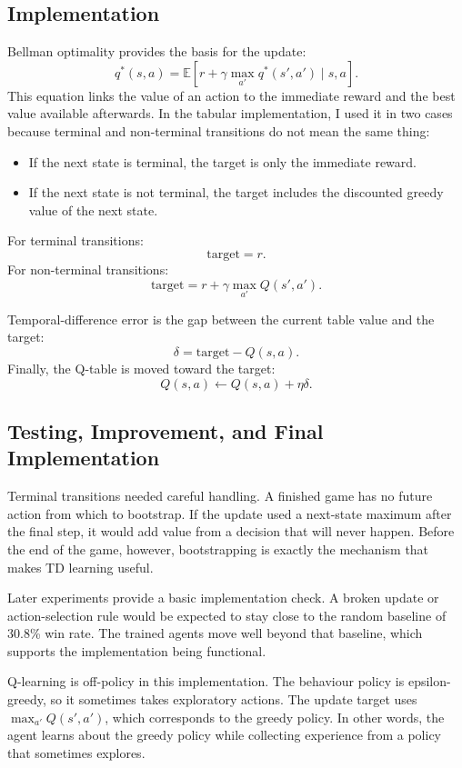 \documentclass[11pt,a4paper]{article}
\begin{document}
\subsection{Implementation}

Bellman optimality provides the basis for the update:
\[
q^*(s, a) = \mathbb{E}[r + \gamma \max_{a'} q^*(s', a') \mid s, a].
\]
This equation links the value of an action to the immediate reward and the best value available afterwards. In the tabular implementation, I used it in two cases because terminal and non-terminal transitions do not mean the same thing:

\begin{itemize}[leftmargin=1.5em]
  \item If the next state is terminal, the target is only the immediate reward.
  \item If the next state is not terminal, the target includes the discounted greedy value of the next state.
\end{itemize}

For terminal transitions:
\[
\text{target} = r.
\]
For non-terminal transitions:
\[
\text{target} = r + \gamma \max_{a'} Q(s', a').
\]

Temporal-difference error is the gap between the current table value and the target:
\[
\delta = \text{target} - Q(s, a).
\]
Finally, the Q-table is moved toward the target:
\[
Q(s, a) \leftarrow Q(s, a) + \eta \delta.
\]

\subsection{Testing, Improvement, and Final Implementation}

Terminal transitions needed careful handling. A finished game has no future action from which to bootstrap. If the update used a next-state maximum after the final step, it would add value from a decision that will never happen. Before the end of the game, however, bootstrapping is exactly the mechanism that makes TD learning useful.

Later experiments provide a basic implementation check. A broken update or action-selection rule would be expected to stay close to the random baseline of 30.8\% win rate. The trained agents move well beyond that baseline, which supports the implementation being functional.

Q-learning is off-policy in this implementation. The behaviour policy is epsilon-greedy, so it sometimes takes exploratory actions. The update target uses $\max_{a'}Q(s',a')$, which corresponds to the greedy policy. In other words, the agent learns about the greedy policy while collecting experience from a policy that sometimes explores.
\end{document}
